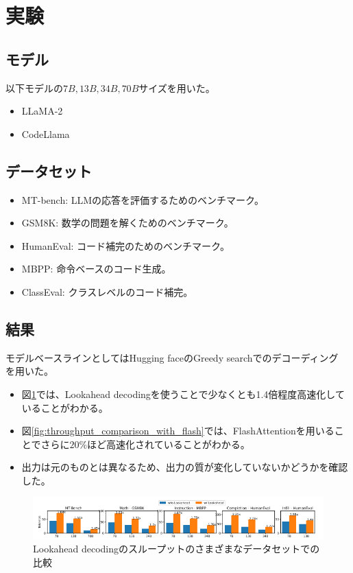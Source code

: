 \documentclass[uplatex]{jsarticle}
\theoremstyle{remark}
\begin{document}
\section{実験}

\subsection{モデル}
以下モデルの$7B, 13B, 34B, 70B$サイズを用いた。
\begin{itemize}
  \item LLaMA-2
  \item CodeLlama 
\end{itemize}

\subsection{データセット}
\begin{itemize}
  \item MT-bench: LLMの応答を評価するためのベンチマーク。
  \item GSM8K: 数学の問題を解くためのベンチマーク。
  \item HumanEval: コード補完のためのベンチマーク。
  \item MBPP: 命令ベースのコード生成。
  \item ClassEval: クラスレベルのコード補完。
\end{itemize}

\subsection{結果}
モデルベースラインとしてはHugging faceのGreedy searchでのデコーディング
を用いた。

\begin{itemize}
  \item 図\ref{fig:throughput_comparison}では、Lookahead decodingを使うことで少なくとも1.4倍程度高速化していることがわかる。
  \item 図\ref{fig:throughput_comparison_with_flash}では、FlashAttentionを用いることでさらに$20\%$ほど高速化されていることがわかる。
  \item 出力は元のものとは異なるため、出力の質が変化していないかどうかを確認した。
\end{itemize}

\begin{figure}
  \centering
  \includegraphics[width=\textwidth]{img/lookahead_decoding/fig5.png}
  \caption{Lookahead decodingのスループットのさまざまなデータセットでの比較}
  \label{fig:throughput_comparison}
\end{figure}
\end{document}

